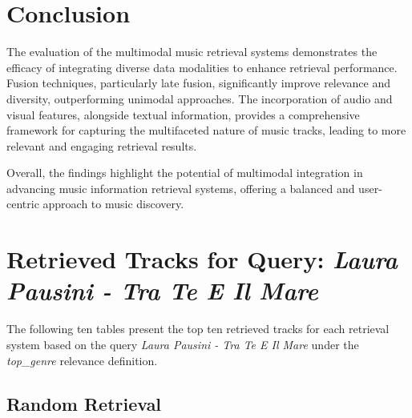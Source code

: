 \documentclass[sigconf]{acmart}
\begin{document}
\section{Conclusion}
\label{subsec:conclusion}

The evaluation of the multimodal music retrieval systems demonstrates the efficacy of integrating diverse data modalities to enhance retrieval performance. Fusion techniques, particularly late fusion, significantly improve relevance and diversity, outperforming unimodal approaches. The incorporation of audio and visual features, alongside textual information, provides a comprehensive framework for capturing the multifaceted nature of music tracks, leading to more relevant and engaging retrieval results.

 Overall, the findings highlight the potential of multimodal integration in advancing music information retrieval systems, offering a balanced and user-centric approach to music discovery.


\appendix



\newpage

\section{Retrieved Tracks for Query: \textit{Laura Pausini - Tra Te E Il Mare}}
\label{app:retrieved_tracks_specific_query}

The following ten tables present the top ten retrieved tracks for each retrieval system based on the query \textit{Laura Pausini - Tra Te E Il Mare} under the \textit{top\_genre} relevance definition.


\subsection{Random Retrieval}

\end{document}
